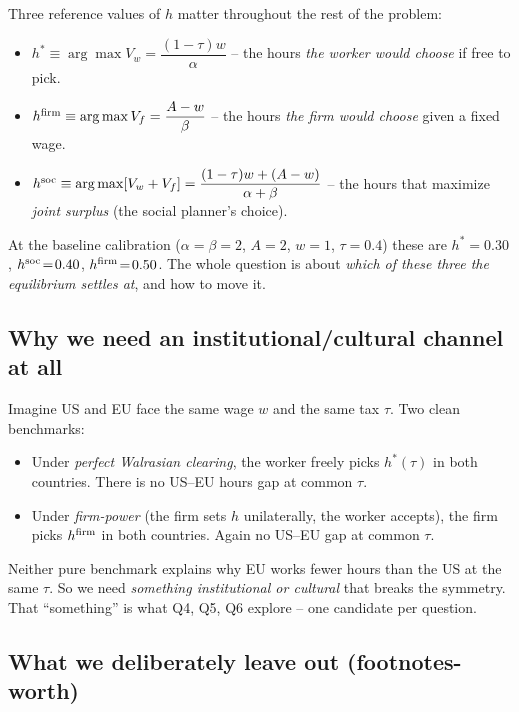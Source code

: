 \documentclass[11pt,a4paper]{article}
\begin{document}
Three reference values of $h$ matter throughout the rest of the problem:
\begin{itemize}
\item $h^\ast \equiv \arg\max V_w = \dfrac{(1-\tau)w}{\alpha}$ -- the
hours \emph{the worker would choose} if free to pick.
\item $h^{\rm firm} \equiv \arg\max V_f = \dfrac{A-w}{\beta}$ -- the
hours \emph{the firm would choose} given a fixed wage.
\item $h^{\rm soc} \equiv \arg\max[V_w+V_f] = \dfrac{(1-\tau)w + (A-w)}{\alpha+\beta}$
-- the hours that maximize \emph{joint surplus} (the social planner's
choice).
\end{itemize}
At the baseline calibration ($\alpha\!=\!\beta\!=\!2$, $A\!=\!2$,
$w\!=\!1$, $\tau\!=\!0.4$) these are $h^\ast\!=\!0.30$,
$h^{\rm soc}\!=\!0.40$, $h^{\rm firm}\!=\!0.50$. The whole question is
about \emph{which of these three the equilibrium settles at}, and how
to move it.

\subsection{Why we need an institutional/cultural channel at all}

Imagine US and EU face the same wage $w$ and the same tax $\tau$. Two
clean benchmarks:
\begin{itemize}
\item Under \emph{perfect Walrasian clearing}, the worker freely picks
$h^\ast(\tau)$ in both countries. There is no US--EU hours gap at common
$\tau$.
\item Under \emph{firm-power} (the firm sets $h$ unilaterally, the
worker accepts), the firm picks $h^{\rm firm}$ in both countries. Again
no US--EU gap at common $\tau$.
\end{itemize}

Neither pure benchmark explains why EU works fewer hours than the US
at the same $\tau$. So we need \emph{something institutional or
cultural} that breaks the symmetry. That ``something'' is what Q4, Q5,
Q6 explore -- one candidate per question.

\subsection{What we deliberately leave out (footnotes-worth)}
\end{document}
